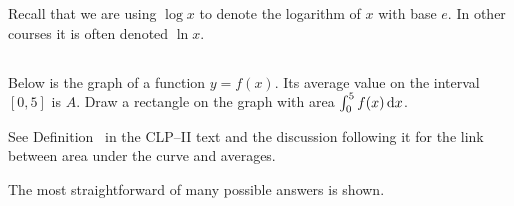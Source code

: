 %
%

Recall that we are using $\log x$ to denote the logarithm of $x$ with
base $e$. In other courses it is often denoted $\ln x$.

\subsection*{\Conceptual}


\begin{Mquestion}\label{prob_s2.2:avgvalue}
Below is the graph of a function $y=f(x)$. Its average value on the interval  $[0,5]$ is $A$. Draw a rectangle on the graph with area $\int_0^5 f(x)\,\mathrm{d}x$.
\begin{center}
\end{center}
\end{Mquestion}
\begin{hint}
See Definition~ in the CLP--II text and the discussion following it for the link between area under the curve and averages.
\end{hint}
\begin{answer}
The most straightforward of many possible answers is shown.
\begin{center}
\end{center}
\end{answer}
